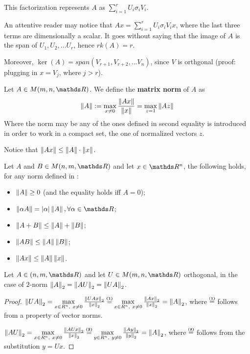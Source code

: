 \documentclass[computationalMathematics.tex]{subfiles}
\begin{document}
This factorization represents $A$ as $\sum\limits_{i=1}^r U_i \sigma_i V_i$. 

An attentive reader may notice that $Ax = \sum\limits_{i=1}^r U_i \sigma_i V_i x$, where the last three terms are dimensionally a scalar.
It goes without saying that the image of $A$ is the span of $U_1, U_2, \ldots U_r$, hence $rk(A) = r$.

Moreover, $\ker(A)=span(V_{r+1}, V_{r+2}, \ldots V_{n})$, since $V$ is orthgonal (proof: plugging in $x=V_j$, where $j>r$). 

\begin{definition}
  Let $A \in M(m, n, \R)$. We define the \textbf{matrix norm} of $A$ as
  \[
    \left\lVert A\right\rVert := \max\limits_{x \neq 0} \frac{\left\lVert Ax\right\rVert}{\left\lVert x\right\rVert} = \max\limits_{z=1}\left\lVert Az\right\rVert
  \]
  Where the norm may be any of the ones defined in  second equality is introduced in order to work in a compact set, the one of normalized vectors $z$.
\end{definition}

Notice that $\left\lVert Ax\right\rVert \le \left\lVert A\right\rVert \cdot \left\lVert x\right\rVert$.

\begin{property}\label{prop:28sett_norms}
  Let $A$ and $B \in M(n, m, \R)$ and let $x \in \R^n$, the following holds, for any norm defined in :
  \begin{itemize}
    \item $\left\lVert A\right\rVert \ge 0$ (and the equality holds iff $A=0$);
    \item $\norm{\alpha A} = |\alpha| \norm{A}, \forall \alpha \in \R$;
    \item $\left\lVert A+B\right\rVert \le \left\lVert A\right\rVert + \left\lVert B\right\rVert$;
    \item $\left\lVert AB\right\rVert \le \left\lVert A\right\rVert \left\lVert B\right\rVert$;
    \item $\left\lVert Ax\right\rVert \le \left\lVert A\right\rVert \left\lVert x\right\rVert$.
  \end{itemize}
\end{property}

\begin{proposition}\label{fact:28sett_orthogonorm}
  Let $A \in (n, m, \R)$ and let $U \in M(m, n, \R)$ orthogonal, in the case of $2$-norm $\left\lVert A\right\rVert_2 = \left\lVert AU\right\rVert_2 = \left\lVert UA\right\rVert_2$.
\end{proposition}

\begin{proof}
  $\norm{UA}_2 = \max\limits_{x \in R^n,~x \ne 0} \frac{\norm{UAx}_2}{\norm{x}_2} \numeq{(1)} \max\limits_{x \in R^n,~x \ne 0} \frac{\norm{Ax}_2}{\norm{x}_2} = \norm{A}_2$, where $\numeq{(1)}$ follows from a property of vector norms.

 $\norm{AU}_2 = \max\limits_{x \in R^n,~x \ne 0} \frac{\norm{AUx}_2}{\norm{x}_2} \numeq{(2)} \max\limits_{y \in R^n,~y \ne 0} \frac{\norm{Ay}_2}{\norm{y}_2} = \norm{A}_2$, where $\numeq{(2)}$ follows from the substitution $y=Ux$.
\end{proof}
\end{document}
